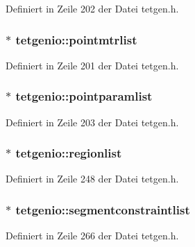 Definiert in Zeile 202 der Datei tetgen.\-h.

\hypertarget{classtetgenio_adc248b0a839167ad5389711798613114}{
\subsubsection[{pointmtrlist}]{$\ast$ tetgenio\-::pointmtrlist}}\label{classtetgenio_adc248b0a839167ad5389711798613114}


Definiert in Zeile 201 der Datei tetgen.\-h.

\hypertarget{classtetgenio_ab7bc1e01d32b9c2f9537ccecac5a4a04}{
\subsubsection[{pointparamlist}]{$\ast$ tetgenio\-::pointparamlist}}\label{classtetgenio_ab7bc1e01d32b9c2f9537ccecac5a4a04}


Definiert in Zeile 203 der Datei tetgen.\-h.

\hypertarget{classtetgenio_a74b5593324c79ad60d9bb0951afb2b41}{
\subsubsection[{regionlist}]{$\ast$ tetgenio\-::regionlist}}\label{classtetgenio_a74b5593324c79ad60d9bb0951afb2b41}


Definiert in Zeile 248 der Datei tetgen.\-h.

\hypertarget{classtetgenio_ab63298ebb6904d1dfa8ddebb13440ef7}{
\subsubsection[{segmentconstraintlist}]{$\ast$ tetgenio\-::segmentconstraintlist}}\label{classtetgenio_ab63298ebb6904d1dfa8ddebb13440ef7}


Definiert in Zeile 266 der Datei tetgen.\-h.


